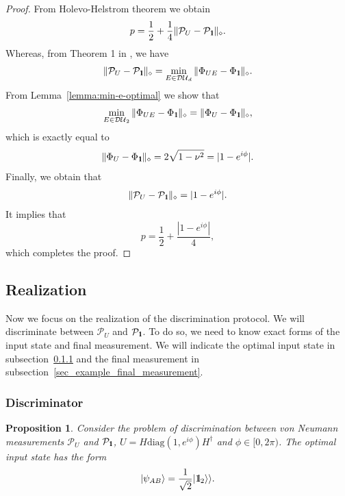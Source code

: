 \documentclass[preprint,12pt, a4paper]{elsarticle}
\newcommand{\ket}[1]{\ensuremath{|#1\rangle}}
\newcommand{\1}{{\rm 1\hspace{-0.9mm}l}}
\newcommand{\Id}{{\rm 1\hspace{-0.9mm}l}}
\newcommand{\PP}{\mathcal{P}}
\newcommand{\diaguni}{\ensuremath{\mathcal{DU}}}
\newcommand{\diag}{\mathrm{diag}}
\newtheorem{proposition}{Proposition}
\begin{document}
\begin{proof}
	From Holevo-Helstrom theorem we obtain
	\begin{equation}
	p = \frac{1}{2} + \frac{1}{4} \| \PP_{U} - \PP_{\Id} \|_\diamond.
	\end{equation}
	Whereas, from Theorem 1 in \cite{puchala2018strategies}, we have 
	\begin{equation}
	\|\PP_U - \PP_\Id\|_\diamond = \min_{E \in \diaguni_d} \|\Phi_{UE} - 
	\Phi_\Id\|_\diamond. 
	\end{equation}
	From Lemma~\ref{lemma:min-e-optimal} we show that 
	\begin{equation}
		\min_{E \in \diaguni_2} \|\Phi_{UE} - 
	\Phi_\Id\|_\diamond = \|\Phi_{U} - 
	\Phi_\Id\|_\diamond,
	\end{equation} which is exactly equal to 
	\begin{equation}
	\|\Phi_{U} - 
	\Phi_\Id\|_\diamond = 2\sqrt{1 - \nu^2} = |1-e^{i   \phi }|. 
	\end{equation}
	Finally, we obtain that
	\begin{equation}
	\| \PP_{U} - \PP_{\Id} \|_\diamond =  |1-e^{i   \phi }|.
	\end{equation}
	It implies that
	\begin{equation}
	p  = \frac{1}{2} + \frac{|1-e^{i \phi}|}{4},
	\end{equation} which completes the proof.
\end{proof}





\subsection{Realization}\label{sec:example_realization}
Now we focus on the realization of the discrimination protocol. We will 
discriminate between $\PP_U$ and $\PP_\1$. To do so, we need to know exact 
forms of the input state and final measurement. We will indicate the optimal 
input state in subsection~\ref{sec:example_discriminator} and the final 
measurement in subsection~\ref{sec_example_final_measurement}.


\subsubsection{Discriminator}\label{sec:example_discriminator}

\begin{proposition}\label{prop-discrim}
Consider the problem of discrimination between von Neumann measurements $\PP_U$ 
and $\PP_\1$, $U = H\diag(1, e^{i \phi}) H^\dagger $ and $\phi \in [0, 
2\pi)$.  The optimal input state has the form
\begin{equation}
\ket{\psi_{AB}} = \frac{1}{\sqrt{2}} |\Id_2 \rangle \rangle.
\end{equation}
\end{proposition}
\end{document}
